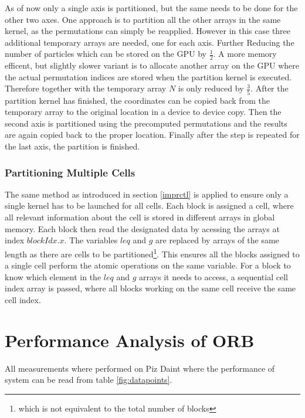 \documentclass[]{article}
\begin{document}
As of now only a single axis is partitioned, but the same needs to be done for the other two axes. One approach is to partition all the other arrays in the same kernel, as the permutations can simply be reapplied. However in this case three  additional temporary arrays are needed, one for each axis. Further Reducing the number of particles which can be stored on the GPU by $\frac{1}{2}$. A more memory efficent, but slightly slower variant is to allocate another array on the GPU where the actual permutation indices are stored when the partition kernel is executed. Therefore together with the temporary array $N$ is only reduced by $\frac{3}{5}$. After the partition kernel has finished, the coordinates can be copied back from the temporary array to the original location in a device to device copy. Then the second axis is partitioned using the precomputed permutations and the results are again copied back to the proper location. Finally after the step is repeated for the last axis, the partition is finished.

\subsubsection{Partitioning Multiple Cells}

The same method as introduced in section \ref{imprctl} is applied to ensure only a single kernel has to be launched for all cells. 
Each block is assigned a cell, where all relevant information about the cell is stored in different arrays in global memory. Each block then read the designated data by acessing the arrays at index $blockIdx.x$. The variables $leq$ and $g$ are replaced by arrays of the same length as there are cells to be partitioned\footnote{which is not equivalent to the total number of blocks}. This ensures all the blocks assigned to a single cell perform the atomic operations on the same variable. For a block to know which element in the $leq$ and $g$ arrays it needs to access, a sequential cell index array is passed, where all blocks working on the same cell receive the same cell index. 


\newpage
\section{Performance Analysis of ORB}\label{sec:empan}

All measurements where performed on Piz Daint where the performance of system can be read from table \ref{fig:datapoints}.
\end{document}
